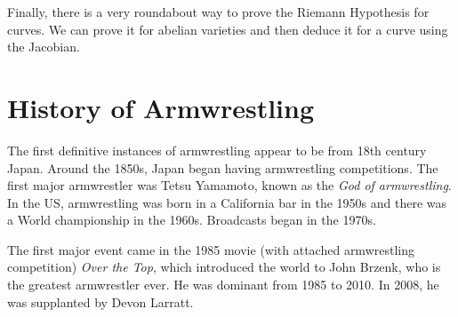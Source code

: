\documentclass[leqno, openany]{memoir}
\theoremstyle{definition}
\theoremstyle{remark}
\theoremstyle{plain}
\theoremstyle{definition}
\theoremstyle{remark}
\begin{document}
Finally, there is a very roundabout way to prove the Riemann Hypothesis for curves. We can prove it for abelian varieties and then deduce it for a curve using the Jacobian.

\section{History of Armwrestling}%
\label{sec:history_of_armwrestling}

The first definitive instances of armwrestling appear to be from 18th century Japan. Around the 1850s, Japan began having armwrestling competitions. The first major armwrestler was Tetsu Yamamoto, known as the \textit{God of armwrestling}. In the US, armwrestling was born in a California bar in the 1950s and there was a World championship in the 1960s. Broadcasts began in the 1970s.

The first major event came in the 1985 movie (with attached armwrestling competition) \textit{Over the Top}, which introduced the world to John Brzenk, who is the greatest armwrestler ever. He was dominant from 1985 to 2010. In 2008, he was supplanted by Devon Larratt. 
\end{document}
